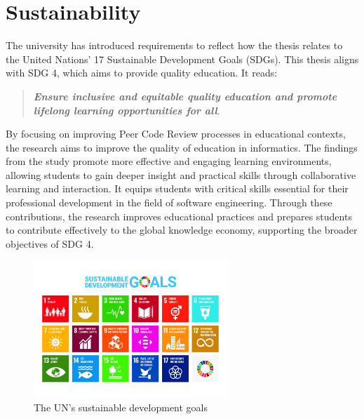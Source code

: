 \section{Sustainability}
The university has introduced requirements to reflect how the thesis relates to the United Nations' 17 Sustainable Development Goals (SDGs). This thesis aligns with SDG 4, which aims to provide quality education. It reads: 

\begin{quote}
\textbf{\textit{Ensure inclusive and equitable quality education and promote lifelong learning opportunities for all}}\cite{Nations}.
\end{quote}

By focusing on improving Peer Code Review processes in educational contexts, the research aims to improve the quality of education in informatics. The findings from the study promote more effective and engaging learning environments, allowing students to gain deeper insight and practical skills through collaborative learning and interaction. It equips students with critical skills essential for their professional development in the field of software engineering. Through these contributions, the research improves educational practices and prepares students to contribute effectively to the global knowledge economy, supporting the broader objectives of SDG 4.


\begin{figure}[H]
    \centering
\includegraphics[width=0.65\textwidth]{Figures/SDG_2019.jpg}
    \caption{The UN's sustainable development goals~\cite{SDGs}}
    \label{fig:UN_SDGs}
\end{figure}